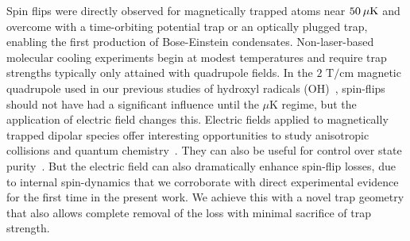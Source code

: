 \documentclass[%
 reprint,
 amsmath,amssymb,
 aps,
prl,
]{revtex4-1}
\newcommand{\s}{{\nobreak\hspace{.2em}}}
\begin{document}
Spin flips were directly observed for magnetically trapped atoms near $50\s\mu\text{K}$ and overcome with a time-orbiting potential trap\s\cite{Petrich1995} or an optically plugged trap\s\cite{Davis1995}, enabling the first production of Bose-Einstein condensates.
Non-laser-based molecular cooling experiments begin at modest temperatures and require trap strengths typically only attained with quadrupole fields\s\cite{Weinstein1998, Sawyer2008, Riedel2011, Quintero-Perez2014, Akerman2017}.
In the $2\text{ T/cm}$ magnetic quadrupole used in our previous studies of hydroxyl radicals (OH)~\cite{Stuhl2012evap}, spin-flips should not have had a significant influence until the $\mu$K regime, but the application of electric field changes this.
Electric fields applied to magnetically trapped dipolar species offer interesting opportunities to study anisotropic collisions and quantum chemistry~\cite{Stuhl2013}.
They can also be useful for control over state purity~\cite{Stuhl2012uwave}.
But the electric field can also dramatically enhance spin-flip losses, due to internal spin-dynamics that we corroborate with direct experimental evidence for the first time in the present work.
We achieve this with a novel trap geometry that also allows complete removal of the loss with minimal sacrifice of trap strength.
\end{document}
